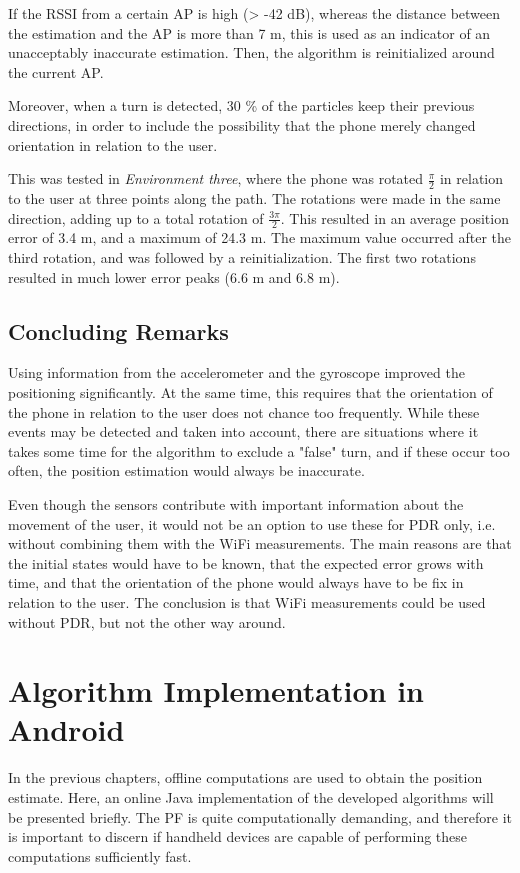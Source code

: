 \documentclass{LTHthesis}
\begin{document}
If the RSSI from a certain AP is high (> -42 dB), whereas the distance between the estimation and the AP is more than 7 m, this is used as an indicator of an unacceptably inaccurate estimation. Then, the algorithm is reinitialized around the current AP.

Moreover, when a turn is detected, 30 \% of the particles keep their previous directions, in order to include the possibility that the phone merely changed orientation in relation to the user.

This was tested in \emph{Environment three}, where the phone was rotated $\frac{\pi}{2}$ in relation to the user at three points along the path. The rotations were made in the same direction, adding up to a total rotation of $\frac{3\pi}{2}$. This resulted in an average position error of 3.4 m, and a maximum of 24.3 m. The maximum value occurred after the third rotation, and was followed by a reinitialization. The first two rotations resulted in much lower error peaks (6.6 m and 6.8 m).




\section{Concluding Remarks}
%
Using information from the accelerometer and the gyroscope improved the positioning significantly. At the same time, this requires that the orientation of the phone in relation to the user does not chance too frequently. While these events may be detected and taken into account, there are situations where it takes some time for the algorithm to exclude a "false" turn, and if these occur too often, the position estimation would always be inaccurate.

Even though the sensors contribute with important information about the movement of the user, it would not be an option to use these for PDR only, i.e. without combining them with the WiFi measurements. The main reasons are that the initial states would have to be known, that the expected error grows with time, and that the orientation of the phone would always have to be fix in relation to the user. The conclusion is that WiFi measurements could be used without PDR, but not the other way around.






\chapter{Algorithm Implementation in Android}
\label{chap:implement}
%
In the previous chapters, offline computations are used to obtain the position estimate. Here, an online Java implementation of the developed algorithms will be presented briefly. The PF is quite computationally demanding, and therefore it is important to discern if handheld devices are capable of performing these computations sufficiently fast. 
\end{document}
